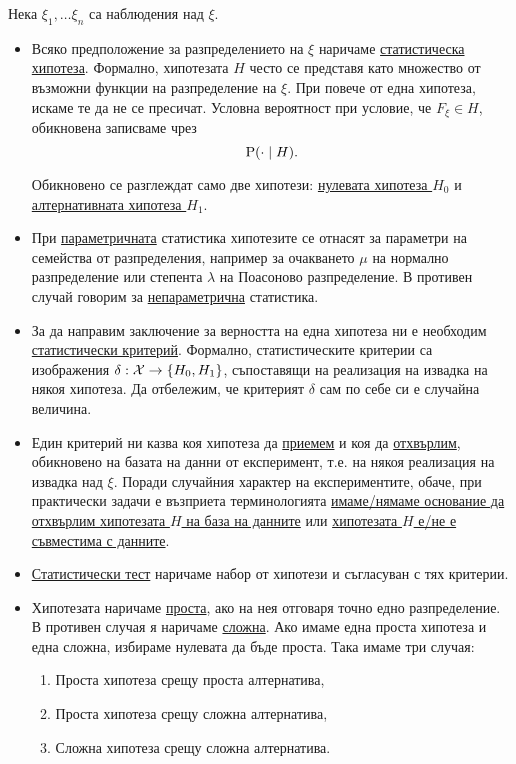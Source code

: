 \documentclass[numbers=endperiod, DIV=15, bibliography=totocnumbered]{scrartcl}
\begin{document}
\begin{definition}[Хипотези]
  Нека $\xi_1, \ldots \xi_n$ са наблюдения над $\xi$.

  \begin{itemize}
    \item Всяко предположение за разпределението на $\xi$ наричаме \uline{статистическа хипотеза}. Формално, хипотезата $H$ често се представя като множество от възможни функции на разпределение на $\xi$. При повече от една хипотеза, искаме те да не се пресичат. Условна вероятност при условие, че $F_\xi \in H$, обикновена записваме чрез
    \begin{displaymath}
      \operatorname{P}(\cdot \mid H).
    \end{displaymath}

    Обикновено се разглеждат само две хипотези: \uline{нулевата хипотеза $H_0$} и \uline{алтернативната хипотеза $H_1$}.

    \item При \uline{параметричната} статистика хипотезите се отнасят за параметри на семейства от разпределения, например за очакването $\mu$ на нормално разпределение или степента $\lambda$ на Поасоново разпределение. В противен случай говорим за \uline{непараметрична} статистика.

    \item За да направим заключение за верността на една хипотеза ни е необходим \uline{статистически критерий}. Формално, статистическите критерии са изображения $\delta: \mathcal{X} \to \{ H_0, H_1 \}$, съпоставящи на реализация на извадка на някоя хипотеза. Да отбележим, че критерият $\delta$ сам по себе си е случайна величина.

    \item Един критерий ни казва коя хипотеза да \uline{приемем} и коя да \uline{отхвърлим}, обикновено на базата на данни от експеримент, т.е. на някоя реализация на извадка над $\xi$. Поради случайния характер на експериментите, обаче, при практически задачи е възприета терминологията \uline{имаме/нямаме основание да отхвърлим хипотезата $H$ на база на данните} или \uline{хипотезата $H$ е/не е съвместима с данните}.

    \item \uline{Статистически тест} наричаме набор от хипотези и съгласуван с тях критерии.

    \item Хипотезата наричаме \uline{проста}, ако на нея отговаря точно едно разпределение. В противен случая я наричаме \uline{сложна}. Ако имаме една проста хипотеза и една сложна, избираме нулевата да бъде проста. Така имаме три случая:
    \begin{enumerate}
      \item Проста хипотеза срещу проста алтернатива,
      \item Проста хипотеза срещу сложна алтернатива,
      \item Сложна хипотеза срещу сложна алтернатива.
    \end{enumerate}


\end{itemize}
\end{definition}
\end{document}
